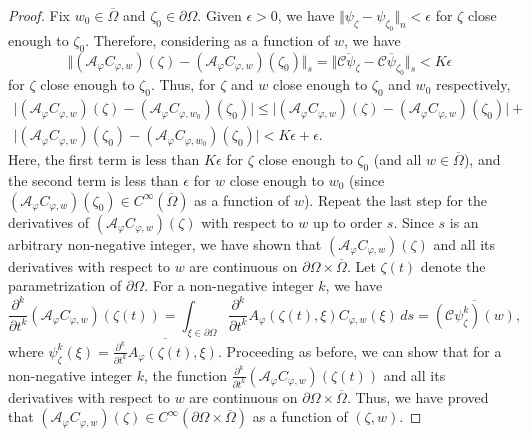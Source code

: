 \documentclass[11pt, reqno]{amsart}
\numberwithin{equation}{section}
\begin{document}
\begin{proof}
\medskip

Fix $w_0\in\overline{\Omega}$ and $\zeta_0\in\partial\Omega$. Given $\epsilon>0$, we have $\Vert \psi_{\zeta}-\psi_{\zeta_0}\Vert_n<\epsilon$ for $\zeta$ close enough to $\zeta_0$. Therefore, considering as a function of $w$, we have
\[
\Vert (\mathcal{A}_{\varphi} C_{\varphi,w})(\zeta)-(\mathcal{A}_{\varphi}C_{\varphi,w})(\zeta_0)\Vert_s
=
\Vert \overline{\mathcal{C} \psi_{\zeta}}-\overline{\mathcal{C} \psi_{\zeta_0}}\Vert_s
<
K\epsilon
\]
for $\zeta$ close enough to $\zeta_0$. Thus, for $\zeta$ and $w$ close enough to $\zeta_0$ and $w_0$ respectively,
\begin{multline*}
\vert (\mathcal{A}_{\varphi} C_{\varphi,w})(\zeta)-(\mathcal{A}_{\varphi} C_{\varphi,w_0})(\zeta_0)\vert 
\leq 
\vert (\mathcal{A}_{\varphi} C_{\varphi,w})(\zeta) - (\mathcal{A}_{\varphi} C_{\varphi,w})(\zeta_0)\vert
+\\
\vert (\mathcal{A}_{\varphi} C_{\varphi,w})(\zeta_0)-(\mathcal{A}_{\varphi} C_{\varphi,w_0})(\zeta_0)\vert
<
K\epsilon+\epsilon.
\end{multline*}
Here, the first term is less than $K\epsilon$ for $\zeta$ close enough to $\zeta_0$ (and all $w\in\overline{\Omega}$), and the second term is less than $\epsilon$ for $w$ close enough to $w_0$ (since $(\mathcal{A}_{\varphi}C_{\varphi,w})(\zeta_0)\in C^{\infty}(\overline{\Omega})$ as a function of $w$). Repeat the last step for the derivatives of $(\mathcal{A}_{\varphi} C_{\varphi,w})(\zeta)$ with respect to $w$ up to order $s$. Since $s$ is an arbitrary non-negative integer, we have shown that $(\mathcal{A}_{\varphi} C_{\varphi,w})(\zeta)$ and all its derivatives with respect to $w$ are continuous on $\partial\Omega\times\overline{\Omega}$. Let $\zeta(t)$ denote the parametrization of $\partial\Omega$. For a non-negative integer $k$, we have
\[
\frac{\partial^k}{\partial t^k}(\mathcal{A}_{\varphi} C_{\varphi,w})(\zeta(t))=\int_{\xi\in\partial\Omega} \frac{\partial^k}{\partial t^k} A_{\varphi}(\zeta(t),\xi) C_{\varphi,w}(\xi)\,ds=\overline{(\mathcal{C}\psi_{\zeta}^k)(w)},
\]
where $\psi_{\zeta}^k(\xi)=\overline{\frac{\partial^k}{\partial t^k}A_{\varphi}(\zeta(t),\xi)}$. Proceeding as before, we can show that for a non-negative integer $k$, the function $\frac{\partial^k}{\partial t^k}(\mathcal{A}_{\varphi} C_{\varphi,w})(\zeta(t))$ and all its derivatives with respect to $w$ are continuous on $\partial\Omega\times\overline{\Omega}$. Thus, we have proved that $(\mathcal{A}_{\varphi}C_{\varphi,w})(\zeta)\in C^{\infty}(\partial\Omega\times\overline{\Omega})$ as a function of $(\zeta,w)$.


\end{proof}
\end{document}
